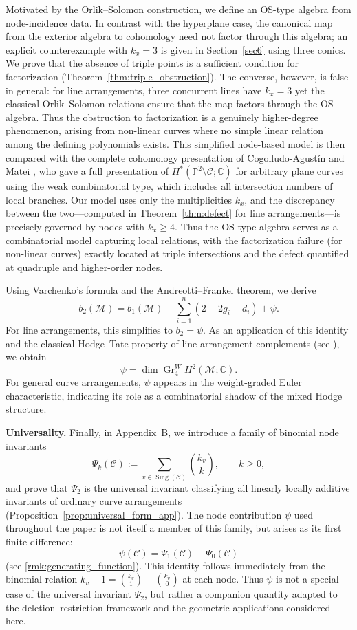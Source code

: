 \documentclass[article,11pt]{amsart} \numberwithin{equation}{section}
\numberwithin{equation}{section}
\begin{document}
{Motivated by the Orlik--Solomon construction, we define an OS-type algebra from node-incidence data. In contrast with the hyperplane case, the canonical map from the exterior algebra to cohomology need not factor through this algebra; an explicit counterexample with $k_x=3$ is given in Section~\ref{sec6} using three conics. We prove that the absence of triple points is a sufficient condition for factorization (Theorem~\ref{thm:triple_obstruction}). The converse, however, is false in general: for line arrangements, three concurrent lines have $k_x=3$ yet the classical Orlik--Solomon relations ensure that the map factors through the OS-algebra. Thus the obstruction to factorization is a genuinely higher-degree phenomenon, arising from non-linear curves where no simple linear relation among the defining polynomials exists. This simplified node-based model is then compared with the complete cohomology presentation of Cogolludo-Agust\'in and Matei \cite{CogolludoMatei2012}, who gave a full presentation of $H^*(\mathbb P^2\setminus\mathcal C;\mathbb C)$ for arbitrary plane curves using the weak combinatorial type, which includes all intersection numbers of local branches. Our model uses only the multiplicities $k_x$, and the discrepancy between the two—computed in Theorem~\ref{thm:defect} for line arrangements—is precisely governed by nodes with $k_x\ge4$. Thus the OS-type algebra serves as a combinatorial model capturing local relations, with the factorization failure (for non-linear curves) exactly located at triple intersections and the defect quantified at quadruple and higher-order nodes.

Using Varchenko's formula and the Andreotti--Frankel theorem, we derive
\[
b_2(\mathcal M)=b_1(\mathcal M)-\sum_{i=1}^n(2-2g_i-d_i)+\psi.
\]
For line arrangements, this simplifies to $b_2=\psi$. As an application of this identity and the classical Hodge--Tate property of line arrangement complements (see \cite{dimca, PetersSteenbrink}), we obtain
\[
\psi=\dim\operatorname{Gr}_4^W H^2(\mathcal M;\mathbb C).
\]
For general curve arrangements, $\psi$ appears in the weight-graded Euler characteristic, indicating its role as a combinatorial shadow of the mixed Hodge structure.

\medskip
\noindent\textbf{Universality.}
Finally, in Appendix~B, we introduce a family of binomial node invariants
\[
\Psi_k(\mathcal C):=\sum_{v\in\operatorname{Sing}(\mathcal C)}\binom{k_v}{k},
\qquad k\ge 0,
\]
and prove that $\Psi_2$ is the universal invariant classifying all linearly locally additive invariants of ordinary curve arrangements (Proposition~\ref{prop:universal_form_app}). The node contribution $\psi$ used throughout the paper is not itself a member of this family, but arises as its first finite difference:
\[
\psi(\mathcal C)=\Psi_1(\mathcal C)-\Psi_0(\mathcal C)
\]
(see \ref{rmk:generating_function}). This identity follows immediately from the binomial relation $k_v-1=\binom{k_v}{1}-\binom{k_v}{0}$ at each node. Thus $\psi$ is not a special case of the universal invariant $\Psi_2$, but rather a companion quantity adapted to the deletion--restriction framework and the geometric applications considered here.

}
\end{document}
